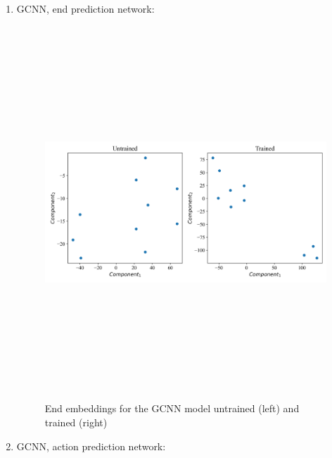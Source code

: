 \documentclass[
]{elteikthesis}[2023/04/10]
\begin{document}
\begin{enumerate}
\item GCNN, end prediction network:
\begin{figure}[H]
\begin{centering}
\includegraphics[width=14cm,height=14cm,keepaspectratio]{images/embeddings_before_after_end_gcnn_2023-05-05_15-03}
\par\end{centering}
\caption{End embeddings for the GCNN model untrained (left) and trained (right)}
\end{figure}
\item GCNN, action prediction network: 
\begin{figure}[H]
\begin{centering}

\end{centering}
\end{figure}
\end{enumerate}
\end{document}
